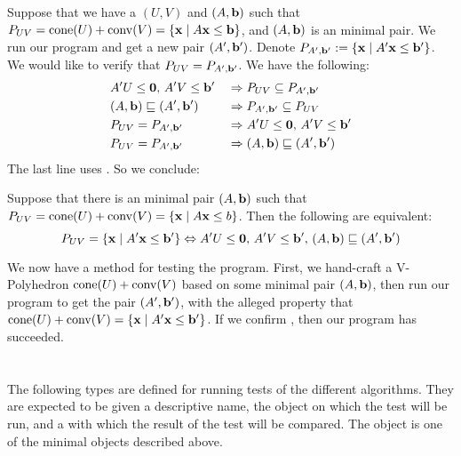 Suppose that we have a $(U,V)$ and $(A,\mathbf{b})$ such that $P_{UV} = \operatorname{cone}(U) + \operatorname{conv}(V) = \left\{\mathbf{x}\;|\; A\mathbf{x}\leq \mathbf{b}\right\}$, and $(A,\mathbf{b})$ is an minimal pair.  We run our program and get a new pair $(A',\mathbf{b}')$.  Denote $P_{A',\mathbf{b}'} := \left\{\mathbf{x}\;|\; A'\mathbf{x}\leq \mathbf{b}'\right\}$.  We would like to verify that $P_{UV} = P_{A',\mathbf{b}'}$.  We have the following:
\begin{alignat*}{2}
	 & A'U\leq\mathbf{0},\, A'V\leq\mathbf{b}'     & \;\Rightarrow\; & P_{UV} \subseteq P_{A',\mathbf{b}'} \\
	 & (A,\mathbf{b}) \sqsubseteq (A',\mathbf{b}') & \;\Rightarrow\; & P_{A',\mathbf{b}'} \subseteq P_{UV} \\
	 & P_{UV} = P_{A',\mathbf{b}'}         & \;\Rightarrow\; & A'U\leq\mathbf{0},\, A'V\leq\mathbf{b}'     \\
	 & P_{UV} = P_{A',\mathbf{b}'}         & \;\Rightarrow\; & (A,\mathbf{b}) \sqsubseteq (A',\mathbf{b}')
\end{alignat*}
The last line uses .  So we conclude:

\begin{EqCriteria}\label{eq_vp_hp}
	Suppose that there is an minimal pair $(A,\mathbf{b})$ such that $P_{UV} = \operatorname{cone}(U) + \operatorname{conv}(V) = \left\{\mathbf{x}\;|\; A\mathbf{x}\leq b\right\}$.  Then the following are equivalent:
	\[ P_{UV} = \left\{\mathbf{x}\;|\; A'\mathbf{x}\leq \mathbf{b}'\right\} \Leftrightarrow A'U\leq\mathbf{0},\,A'V\leq\mathbf{b}',\,(A,\mathbf{b})\sqsubseteq (A',\mathbf{b}') \]
\end{EqCriteria}

\begin{Test}\label{test_vp_to_hp}
	We now have a method for testing the program.  First, we hand-craft a V-Polyhedron $\operatorname{cone}(U) + \operatorname{conv}(V)$ based on some minimal pair $(A,\mathbf{b})$, then run our program to get the pair $(A',\mathbf{b}')$, with the alleged property that $\operatorname{cone}(U) + \operatorname{conv}(V) = \left\{\mathbf{x}\;|\; A'\mathbf{x}\leq \mathbf{b}'\right\}$.  If we confirm , then our program has succeeded.
\end{Test}

\section{}

The following types are defined for running tests of the different algorithms.  They are expected to be given a descriptive name, the object on which the test will be run, and a  with which the result of the test will be compared.  The  object is one of the minimal objects described above.
\lsthconetestcasea
\lstvconetestcasea
\lsthpolytestcaseb
\lstvpolytestcaseb

\section{}

